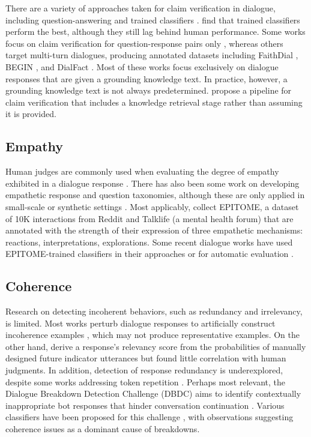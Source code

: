 There are a variety of approaches taken for claim verification in dialogue, including question-answering \cite{honovich:21} and trained classifiers \cite{dziri_begin:22}. \citet{dziri_begin:22} find that trained classifiers perform the best, although they still lag behind human performance. Some works focus on claim verification for question-response pairs only \cite{wang:22}, whereas others target multi-turn dialogues, producing annotated datasets including FaithDial \cite{dziri_faithdial:22}, BEGIN \cite{dziri_begin:22}, and DialFact \cite{gupta:22}. Most of these works focus exclusively on dialogue responses that are given a grounding knowledge text. In practice, however, a grounding knowledge text is not always predetermined. \citet{gupta:22} propose a pipeline for claim verification that includes a knowledge retrieval stage rather than assuming it is provided.

\subsection{Empathy}
\label{sec:rw_empathy}

Human judges are commonly used when evaluating the degree of empathy exhibited in a dialogue response \cite{zhong:20,sabour:22,qian:23}. There has also been some work on developing empathetic response and question taxonomies, although these are only applied in small-scale or synthetic settings \cite{welivita:20, svikhnushina:22}. Most applicably, \citet{sharma:20} collect EPITOME, a dataset of 10K interactions from Reddit and Talklife (a mental health forum) that are annotated with the strength of their expression of three empathetic mechanisms: reactions, interpretations, explorations. Some recent dialogue works have used EPITOME-trained classifiers in their approaches \cite{zheng:21, majumder:22} or for automatic evaluation \cite{kim:21, lee:22}.

\subsection{Coherence}
\label{sec:rw_coherence}

Research on detecting incoherent behaviors, such as redundancy and irrelevancy, is limited. Most works perturb dialogue responses to artificially construct incoherence examples \cite{xu:21, zhang:21, ghazarian:22}, which may not produce representative examples. On the other hand, \citet{mehri:20} derive a response's relevancy score from the probabilities of manually designed future indicator utterances but found little correlation with human judgments. In addition, detection of response redundancy is underexplored, despite some works addressing token repetition \cite{li:20, xi:21}. Perhaps most relevant, the Dialogue Breakdown Detection Challenge (DBDC) aims to identify contextually inappropriate bot responses that hinder conversation continuation \cite{higashinaka:19}. Various classifiers have been proposed for this challenge \cite{ng:20,lin:22}, with observations suggesting coherence issues as a dominant cause of breakdowns.

